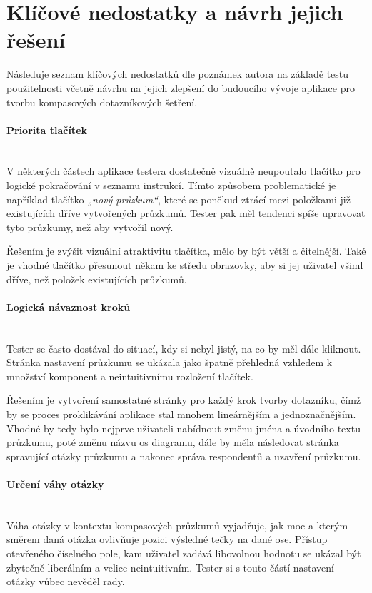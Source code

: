 \section{Klíčové nedostatky a návrh jejich řešení}
Následuje seznam klíčových nedostatků dle poznámek autora na základě testu
použitelnosti včetně návrhu na jejich zlepšení do budoucího vývoje
aplikace pro tvorbu kompasových dotazníkových šetření.

\paragraph{Priorita tlačítek}~\\
V některých částech aplikace testera dostatečně vizuálně neupoutalo
tlačítko pro logické pokračování v seznamu instrukcí. Tímto způsobem
problematické je například tlačítko \textit{„nový průzkum“}, které se poněkud
ztrácí mezi položkami již existujících dříve vytvořených průzkumů. Tester
pak měl tendenci spíše upravovat tyto průzkumy, než aby vytvořil nový.

Řešením je zvýšit vizuální atraktivitu tlačítka, mělo by být větší a čitelnější.
Také je vhodné tlačítko přesunout někam ke středu obrazovky, aby si jej uživatel
všiml dříve, než položek existujících průzkumů.


\paragraph{Logická návaznost kroků}~\\
Tester se často dostával do situací, kdy si nebyl jistý, na co by měl dále kliknout. 
Stránka nastavení průzkumu se ukázala jako špatně přehledná vzhledem k množství komponent
a neintuitivnímu rozložení tlačítek.

Řešením je vytvoření samostatné stránky pro každý krok tvorby dotazníku, čímž by
se proces proklikávání aplikace stal mnohem lineárnějším a jednoznačnějším. Vhodné by tedy
bylo nejprve uživateli nabídnout změnu jména a úvodního textu průzkumu, poté změnu názvu os diagramu,
dále by měla následovat stránka spravující otázky průzkumu a nakonec správa respondentů a uzavření
průzkumu.


\paragraph{Určení váhy otázky}~\\
Váha otázky v kontextu kompasových průzkumů vyjadřuje, jak moc a kterým směrem daná otázka
ovlivňuje pozici výsledné tečky na dané ose. Přístup otevřeného číselného pole, kam uživatel
zadává libovolnou hodnotu se ukázal být zbytečně liberálním a velice neintuitivním. Tester 
si s touto částí nastavení otázky vůbec nevěděl rady.

